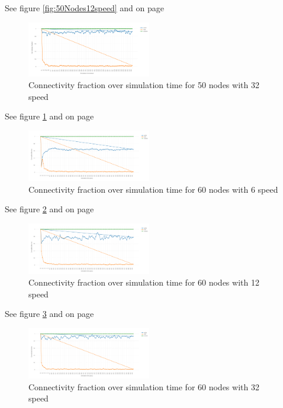 \documentclass[letterpaper, 10 pt, conference]{ieeeconf}  %
\begin{document}
See figure \ref{fig:50Nodes12speed} and on page \pageref{fig:50Nodes12speed}


\begin{figure}[H]
\includegraphics[width=0.48\textwidth]{50Nodes32speed}
\caption{Connectivity fraction over simulation time for 50 nodes with 32 speed}
\label{fig:50Nodes32speed}
\end{figure}

See figure \ref{fig:50Nodes32speed} and on page \pageref{fig:50Nodes32speed}




\begin{figure}[H]
\includegraphics[width=0.48\textwidth]{60Nodes06speed}
\caption{Connectivity fraction over simulation time for 60 nodes with 6 speed}
\label{fig:60Nodes06speed}
\end{figure}

See figure \ref{fig:60Nodes06speed} and on page \pageref{fig:60Nodes06speed}




\begin{figure}[H]
\includegraphics[width=0.48\textwidth]{60Nodes12speed}
\caption{Connectivity fraction over simulation time for 60 nodes with 12 speed}
\label{fig:60Nodes12speed}
\end{figure}

See figure \ref{fig:60Nodes12speed} and on page \pageref{fig:60Nodes12speed}


\begin{figure}[H]
\includegraphics[width=0.48\textwidth]{60Nodes32speed}
\caption{Connectivity fraction over simulation time for 60 nodes with 32 speed}
\label{fig:60Nodes32speed}
\end{figure}
\end{document}
